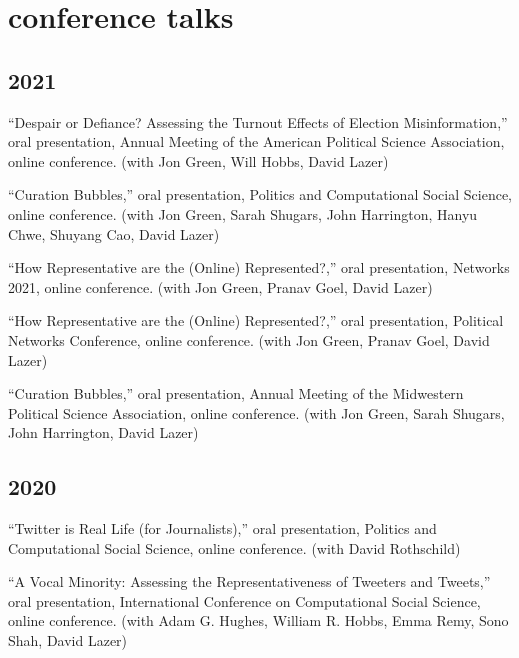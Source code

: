 \documentclass[11pt, letter]{article}
\begin{document}
\section{conference talks}

\subsection{2021}
\begin{hangparas}{.25in}{1}
``Despair or Defiance? Assessing the Turnout Effects of Election
Misinformation,'' oral presentation, Annual Meeting of the American Political
Science Association, online conference. (with Jon Green, Will Hobbs, David
Lazer) \vspace{2mm}

``Curation Bubbles,'' oral presentation, Politics and Computational Social
Science, online conference. (with Jon Green, Sarah Shugars, John Harrington,
Hanyu Chwe, Shuyang Cao, David Lazer) \vspace{2mm}

``How Representative are the (Online) Represented?,'' oral presentation, 
Networks 2021, online conference. (with Jon Green, Pranav
Goel, David Lazer) \vspace{2mm}

``How Representative are the (Online) Represented?,'' oral presentation, 
Political Networks Conference, online conference. (with Jon Green, Pranav
Goel, David Lazer) \vspace{2mm}

``Curation Bubbles,'' oral presentation, Annual Meeting of the Midwestern
Political Science Association, online conference. (with Jon Green, Sarah
Shugars, John Harrington, David Lazer) \vspace{2mm}
\end{hangparas}

\subsection{2020}
\begin{hangparas}{.25in}{1}
``Twitter is Real Life (for Journalists),'' oral presentation, Politics and
Computational Social Science, online conference. (with David
Rothschild) \vspace{2mm}

``A Vocal Minority: Assessing the Representativeness of Tweeters and Tweets,''
oral presentation, International Conference on Computational Social Science,
online conference. (with Adam G. Hughes, William R. Hobbs, Emma Remy, Sono
Shah, David Lazer) \vspace{2mm}
\end{hangparas}
\end{document}
